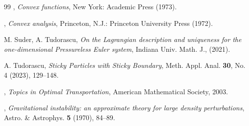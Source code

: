 \documentclass[11pt]{article}
\numberwithin{equation}{section}
\begin{document}
\begin{thebibliography}{99}
, \emph{Convex functions}, New York: Academic Press (1973). 

, \emph{Convex analysis}, Princeton, N.J.: Princeton University Press (1972). 

{\sc M. Suder, A. Tudorascu},
{\em On the Lagrangian description and uniqueness for the one-dimensional Pressureless Euler system},
Indiana Univ. Math. J., %
(2021).

{\sc A. Tudorascu},
{\em Sticky Particles with Sticky Boundary}, Meth. Appl. Anal. \textbf{30}, No. 4 (2023), 129--148.

, \emph{Topics in Optimal Transportation},  American Mathematical Society, 2003.

, \emph{Gravitational instability: an approximate theory for large density perturbations}, Astro. \& Astrophys. \textbf{5} (1970), 84--89.

\end{thebibliography}
\end{document}
